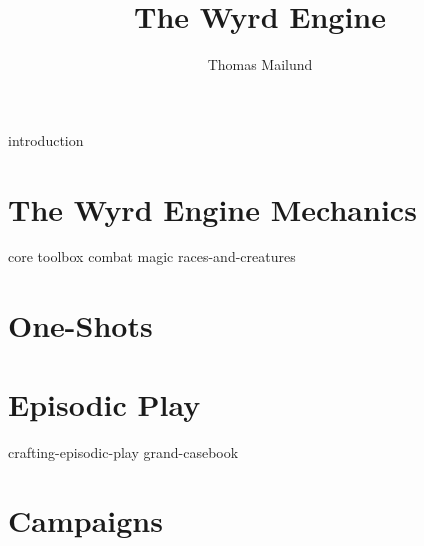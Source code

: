 \documentclass[twocolumn,nodeprecatedcode,bg=print]{dndbook/dndbook}
\title{The Wyrd Engine}
\author{Thomas Mailund}
\begin{document}
\DndSetThemeColor[DmgSlateGray]

\frontmatter
\maketitle
\tableofcontents

\mainmatter%


{introduction}

\part{The Wyrd Engine Mechanics}
{core}
{toolbox}
{combat}
{magic}
{races-and-creatures}

\part{One-Shots}
% 

\part{Episodic Play}
{crafting-episodic-play}
{grand-casebook}

\part{Campaigns}


\printindex
\end{document}
